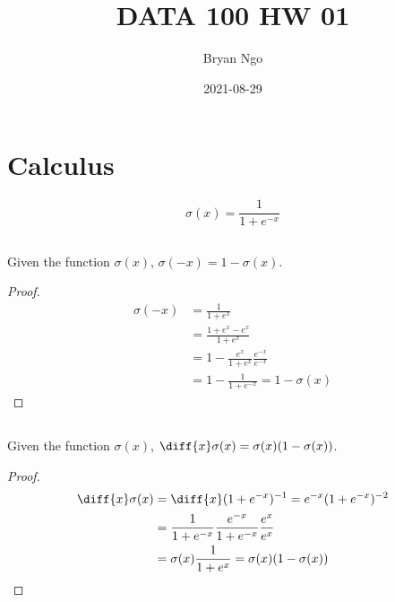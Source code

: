 \documentclass{article}
\title{DATA 100 HW 01}
\author{Bryan Ngo}
\date{2021-08-29}
\begin{document}
\maketitle

\section{Calculus}

\begin{equation}
    \sigma(x) = \frac{1}{1 + e^{-x}}
\end{equation}

\subsection{}

\begin{theorem}
    Given the function \(\sigma(x)\), \(\sigma(-x) = 1 - \sigma(x)\).
\end{theorem}

\begin{proof}
    \begin{align}
        \sigma(-x) &= \frac{1}{1 + e^x} \\
        &= \frac{1 + e^x - e^x}{1 + e^x} \\
        &= 1 - \frac{e^x}{1 + e^x} \frac{e^{-x}}{e^{-x}} \\
        &= 1 - \frac{1}{1 + e^{-x}} = 1 - \sigma(x)
    \end{align}
\end{proof}

\subsection{}

\begin{theorem}
    Given the function \(\sigma(x)\), \(\diff{x} \sigma(x) = \sigma(x) (1 - \sigma(x))\).
\end{theorem}

\begin{proof}
    \begin{align}
        \diff{x} \sigma(x) &= \diff{x} (1 + e^{-x})^{-1} = e^{-x} (1 + e^{-x})^{-2} \\
        &= \frac{1}{1 + e^{-x}} \frac{e^{-x}}{1 + e^{-x}} \frac{e^x}{e^x} \\
        &= \sigma(x) \frac{1}{1 + e^x} = \sigma(x) (1 - \sigma(x))
    \end{align}
\end{proof}
\end{document}
